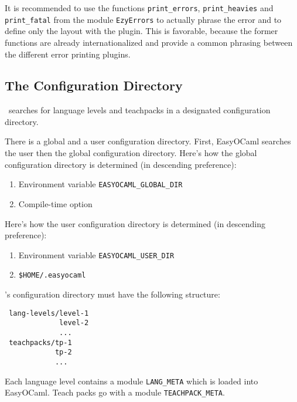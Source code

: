 It is recommended to use the functions \texttt{print\_errors},
\texttt{print\_heavies} and \texttt{print\_fatal} from the module \texttt{EzyErrors}
to actually phrase the error and to define only the layout with the plugin. This
is favorable, because the former functions are already internationalized and
provide a common phrasing between the different error printing plugins.

\subsection{The Configuration Directory}
\label{sec:directory}

\easyocaml\ searches for language levels and teachpacks in a designated
configuration directory.

There is a global and a user configuration directory. First, EasyOCaml 
searches the user then the global configuration directory.  Here's how 
the global configuration directory is determined (in descending 
preference):

\begin{enumerate}
    \item Environment variable \texttt{EASYOCAML\_GLOBAL\_DIR}
    \item Compile-time option
\end{enumerate}

Here's how the user configuration directory is determined (in descending 
preference):

\begin{enumerate}
    \item Environment variable \texttt{EASYOCAML\_USER\_DIR}
    \item \texttt{\$HOME/.easyocaml}
\end{enumerate}

\easyocaml's configuration directory must have the following structure:

\begin{verbatim}
 lang-levels/level-1
             level-2
             ...
 teachpacks/tp-1
            tp-2
            ...
\end{verbatim}

Each language level contains a module \texttt{LANG\_META} which is loaded into
EasyOCaml. Teach packs go with a module \texttt{TEACHPACK\_META}.

